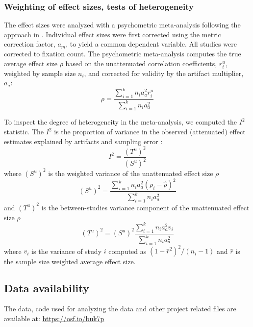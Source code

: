 \documentclass[english,natbib,man,floatsintext]{apa6}
\begin{document}
\subsubsection{Weighting of effect sizes, tests of heterogeneity}

The effect sizes were analyzed with a psychometric meta-analysis following the approach in \cite{hunter2004a}. Individual effect sizes were first corrected using the metric correction factor, $a_m$, to yield a common dependent variable. All studies were corrected to fixation count. The psychometric meta-analysis computes the true average effect size $\rho$ based on the unattenuated correlation coefficients, $r_i^u$, weighted by sample size $n_i$, and corrected for validity by the artifact multiplier, $a_a$: 
%
\begin{equation}
\label{eq:psychometric_rho}
\rho = \frac{\sum_{i=1}^k n_i a_a^2 r_i^u}{\sum_{i=1}^k n_i a_a^2}
\end{equation}

To inspect the degree of heterogeneity in the meta-analysis, we computed the $I^2$ statistic. The $I^2$ is the proportion of variance in the observed (attenuated) effect estimates explained by artifacts and sampling error \citep{borenstein2011introduction}: 
%
\begin{equation}
\label{eq:i2_statistic}
I^2 = \frac{(T^u)^2}{(S^u)^2}
\end{equation}
%
where $(S^u)^2$ is the weighted variance of the unattenuated effect size $\rho$
%
\begin{equation}
\label{eq:Su2_var}
(S^u)^2 = \frac{\sum_{i=1}^k n_i a_a^2 (\rho_i - \hat{\rho})^2}{\sum_{i=1}^k n_i a_a^2}
\end{equation}
%
and $(T^u)^2$ is the between-studies variance component of the unattenuated effect size $\rho$
%
\begin{equation}
\label{eq:Tu2_var}
(T^u)^2 = (S^u)^2 \frac{\sum_{i=1}^k n_i a_a^2 v_i}{\sum_{i=1}^k n_i a_a^2}
\end{equation}
%
where $v_i$ is the variance of study $i$ computed as $(1 - \hat{r}^2)^2 / (n_i - 1)$ and $\hat{r}$ is the sample size weighted average effect size.


\subsection{Data availability}

The data, code used for analyzing the data and other project related files are available at: \url{https://osf.io/buk7p} %
\end{document}
